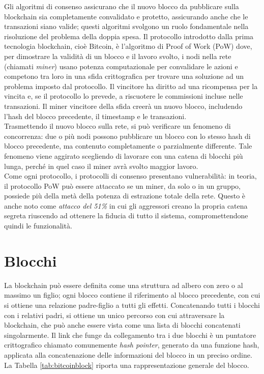Gli algoritmi di consenso assicurano che il nuovo blocco da pubblicare sulla blockchain sia completamente convalidato e protetto, assicurando anche che le transazioni siano valide; questi algoritmi svolgono un ruolo fondamentale nella risoluzione del problema della doppia spesa.
Il protocollo introdotto dalla prima tecnologia blockchain, cioè Bitcoin, è l’algoritmo di  Proof of Work (PoW) dove, per dimostrare la validità di un blocco e il lavoro svolto, i nodi nella rete (chiamati {\it miner\/}) usano potenza computazionale per convalidare le azioni e competono tra loro in una sfida crittografica per trovare una soluzione ad un problema imposto dal protocollo.
Il vincitore ha diritto ad una ricompensa per la vincita e, se il protocollo lo prevede, a riscuotere le commissioni incluse nelle transazioni.
Il miner vincitore della sfida creerà un nuovo blocco, includendo l’hash del blocco precedente, il timestamp e le transazioni. \\
Trasmettendo il nuovo blocco sulla rete, si può verificare un fenomeno di concorrenza: due o più nodi possono pubblicare un blocco con lo stesso hash di blocco precedente, ma contenuto completamente o parzialmente differente. Tale fenomeno viene aggirato scegliendo di lavorare con una catena di blocchi più lunga, perché in quel caso il miner avrà svolto maggior lavoro. \\
Come ogni protocollo, i protocolli di consenso presentano vulnerabilità: in teoria, il protocollo PoW può essere attaccato se un miner, da solo o in un gruppo, possiede più della metà della potenza di estrazione totale della rete. Questo è anche noto come \emph{attacco del 51\%} in cui gli aggressori creano la propria catena segreta riuscendo ad ottenere la fiducia di tutto il sistema, compromettendone quindi le funzionalità.


\section{Blocchi}
\label{sec:blocchiBlockchain}

La blockchain può essere definita come una struttura ad albero con zero o al massimo un figlio; ogni blocco contiene il riferimento al blocco precedente, con cui si ottiene una relazione padre-figlio a tutti gli effetti.
Concatenando tutti i blocchi con i relativi padri, si ottiene un unico percorso con cui attraversare la blockchain, che può anche essere vista come una lista di blocchi concatenati singolarmente.
Il link che funge da collegamento tra i due blocchi è un puntatore crittografico chiamato comunemente {\it hash pointer\/}, generato da una funzione hash, applicata alla concatenazione delle informazioni del blocco in un preciso ordine. La Tabella \ref{tab:bitcoinblock} riporta una rappresentazione generale del blocco.


